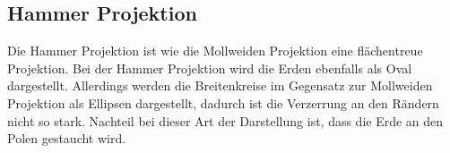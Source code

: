 \subsection{Hammer Projektion}
\label{sec:Hammer}
Die Hammer Projektion ist wie die Mollweiden Projektion eine flächentreue Projektion.
Bei der Hammer Projektion wird die Erden ebenfalls als Oval dargestellt. Allerdings werden die Breitenkreise im Gegensatz zur Mollweiden Projektion als Ellipsen dargestellt, dadurch ist die Verzerrung an den Rändern nicht so stark. Nachteil bei dieser Art der Darstellung ist, dass die Erde an den Polen gestaucht wird.